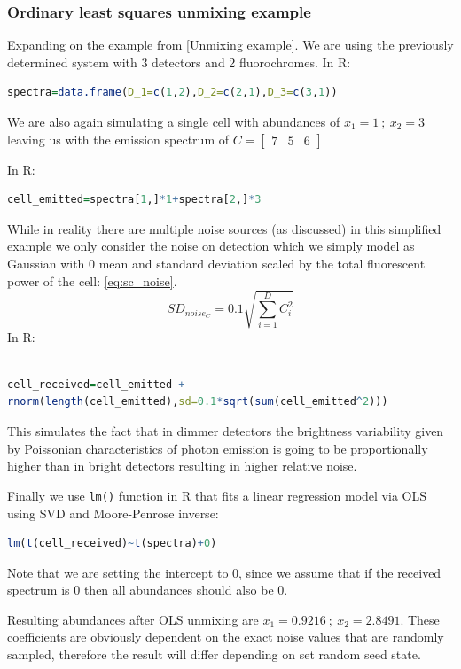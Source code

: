 \subsubsection{Ordinary least squares unmixing example}
Expanding on the example from \ref{Unmixing example}. We are using the previously determined system with 3 detectors and 2 fluorochromes.
In R: \begin{lstlisting}[language=r]
spectra=data.frame(D_1=c(1,2),D_2=c(2,1),D_3=c(3,1))
\end{lstlisting}
We are also again simulating a single cell with abundances of  $x_1=1\ ;\ x_2=3$ leaving us with the emission spectrum of $C=\begin{bmatrix}7 & 5 & 6\end{bmatrix}$

In R:
\begin{lstlisting}[language=r]
cell_emitted=spectra[1,]*1+spectra[2,]*3
\end{lstlisting}

While in reality there are multiple noise sources (as discussed) in this simplified example we only consider the noise on detection which we simply model as Gaussian with 0 mean and standard deviation scaled by the total fluorescent power of the cell: \cref{eq:sc_noise}.
\begin{equation}
SD_{noise_C}=0.1\sqrt{\sum_{i=1}^{D}C_i^2}
\label{eq:sc_noise}
\end{equation}
In R: 
\begin{lstlisting}[language=r]

cell_received=cell_emitted +
rnorm(length(cell_emitted),sd=0.1*sqrt(sum(cell_emitted^2)))
\end{lstlisting}
This simulates the fact that in dimmer detectors the brightness variability given by Poissonian characteristics of photon emission is going to be proportionally higher than in bright detectors resulting in higher relative noise. 

Finally we use \texttt{lm()} function in R that fits a linear regression model via OLS using SVD and Moore-Penrose inverse:
\begin{lstlisting}[language=r]
lm(t(cell_received)~t(spectra)+0)
\end{lstlisting}
Note that we are setting the intercept to 0, since we assume that if the received spectrum is 0 then all abundances should also be 0.

Resulting abundances after OLS unmixing are $x_1=0.9216\ ;\ x_2=2.8491$. These coefficients are obviously dependent on the exact noise values that are randomly sampled, therefore the result will differ depending on set random seed state.

